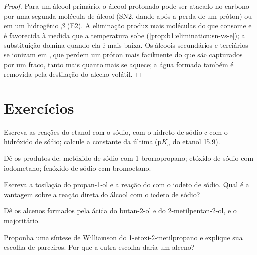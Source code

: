 \begin{proof}
Para um álcool primário, o álcool protonado pode ser atacado no carbono
por uma segunda molécula de álcool (SN2, dando  após a perda de
um próton) ou em um hidrogênio $\beta$ (E2). A eliminação produz mais
moléculas do que consome e é favorecida à medida que a temperatura sobe
(\cref{prop:b1:elimination:sn-vs-e}); a substituição domina quando ela é
mais baixa. Os álcoois secundários e terciários se ionizam em
, que perdem um próton mais facilmente do que são capturados
por um  fraco, tanto mais quanto mais se aquece; a água formada
também é removida pela destilação do alceno volátil.
\end{proof}

\section{Exercícios}

\begin{exercise}[$\star$]\label{exo:b1:alcohol-activation:1}
Escreva as reações do etanol com o sódio, com o hidreto de sódio e com o
hidróxido de sódio; calcule a constante da última ($\mathrm{p}K_a$ do
etanol 15.9).
\end{exercise}

\begin{exercise}[$\star$]\label{exo:b1:alcohol-activation:2}
Dê os produtos de: metóxido de sódio com 1-bromopropano; etóxido de
sódio com iodometano; fenóxido de sódio com bromoetano.
\end{exercise}

\begin{exercise}[$\star$]\label{exo:b1:alcohol-activation:3}
Escreva a tosilação do propan-1-ol e a reação do  com o iodeto
de sódio. Qual é a vantagem sobre a reação direta do álcool com o iodeto
de sódio?
\end{exercise}

\begin{exercise}[$\star$]\label{exo:b1:alcohol-activation:4}
Dê os alcenos formados pela  ácida do butan-2-ol e do
2-metilpentan-2-ol, e o majoritário.
\end{exercise}

\begin{exercise}[$\star\star$]\label{exo:b1:alcohol-activation:5}
Proponha uma síntese de Williamson do 1-etoxi-2-metilpropano e explique
sua escolha de parceiros. Por que a outra escolha daria um alceno?
\end{exercise}

